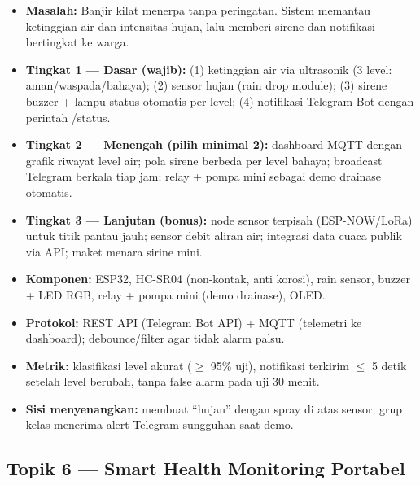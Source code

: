 \documentclass[11pt,a4paper]{article}
\begin{document}
\begin{itemize}
  \item \textbf{Masalah:} Banjir kilat menerpa tanpa peringatan. Sistem
        memantau ketinggian air dan intensitas hujan, lalu memberi sirene dan
        notifikasi bertingkat ke warga.
  \item \textbf{Tingkat 1 --- Dasar (wajib):} (1) ketinggian air via
        ultrasonik (3 level: aman\slash waspada\slash bahaya); (2) sensor
        hujan (rain drop module); (3) sirene buzzer + lampu status otomatis
        per level; (4) notifikasi Telegram Bot dengan perintah /status.
  \item \textbf{Tingkat 2 --- Menengah (pilih minimal 2):} dashboard MQTT
        dengan grafik riwayat level air; pola sirene berbeda per level
        bahaya; broadcast Telegram berkala tiap jam; relay + pompa mini
        sebagai demo drainase otomatis.
  \item \textbf{Tingkat 3 --- Lanjutan (bonus):} node sensor terpisah
        (ESP-NOW/LoRa) untuk titik pantau jauh; sensor debit aliran air;
        integrasi data cuaca publik via API; maket menara sirine mini.
  \item \textbf{Komponen:} ESP32, HC-SR04 (non-kontak, anti korosi), rain
        sensor, buzzer + LED RGB, relay + pompa mini (demo drainase), OLED.
  \item \textbf{Protokol:} REST API (Telegram Bot API) + MQTT (telemetri ke
        dashboard); debounce/filter agar tidak alarm palsu.
  \item \textbf{Metrik:} klasifikasi level akurat ($\geq$ 95\% uji), notifikasi
        terkirim $\leq$ 5 detik setelah level berubah, tanpa false alarm pada
        uji 30 menit.
  \item \textbf{Sisi menyenangkan:} membuat ``hujan'' dengan spray di atas
        sensor; grup kelas menerima alert Telegram sungguhan saat demo.
\end{itemize}

\subsection*{Topik 6 --- Smart Health Monitoring Portabel}
\end{document}
